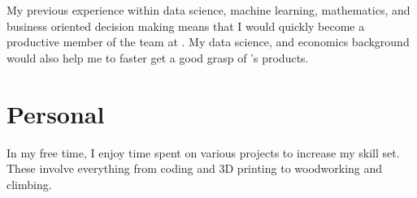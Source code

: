 

\hspace{7 mm} My previous experience within data science, machine learning, mathematics, and business oriented decision making means that I would quickly become a productive member of the team at \company{}. My data science, and economics background would also help me to faster get a good grasp of \company{}'s products.

\section{Personal}
In my free time, I enjoy time spent on various projects to increase my skill set. These involve everything from coding and 3D printing to woodworking and climbing.



